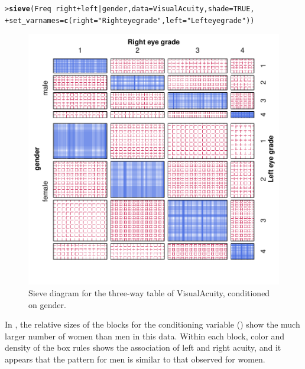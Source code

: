 \documentclass[10pt,krantz2]{krantz}\usepackage[]{graphicx}\usepackage[]{color}
\makeatletter
\newcommand{\hlnum}[1]{\textcolor[rgb]{0.686,0.059,0.569}{#1}}%
\newcommand{\hlstr}[1]{\textcolor[rgb]{0.192,0.494,0.8}{#1}}%
\newcommand{\hlopt}[1]{\textcolor[rgb]{0,0,0}{#1}}%
\newcommand{\hlstd}[1]{\textcolor[rgb]{0.345,0.345,0.345}{#1}}%
\newcommand{\hlkwc}[1]{\textcolor[rgb]{0.333,0.667,0.333}{#1}}%
\newcommand{\hlkwd}[1]{\textcolor[rgb]{0.737,0.353,0.396}{\textbf{#1}}}%
\newenvironment{kframe}{%
 \def\at@end@of@kframe{}%
 \ifinner\ifhmode%
  \def\at@end@of@kframe{\end{minipage}}%
  \begin{minipage}{\columnwidth}%
 \fi\fi%
 \def\FrameCommand##1{\hskip\@totalleftmargin \hskip-\fboxsep
 \colorbox{shadecolor}{##1}\hskip-\fboxsep
     \hskip-\linewidth \hskip-\@totalleftmargin \hskip\columnwidth}%
 \MakeFramed {\advance\hsize-\width
   \@totalleftmargin\z@ \linewidth\hsize
   \@setminipage}}%
 {\par\unskip\endMakeFramed%
 \at@end@of@kframe}
\newenvironment{knitrout}{}{} %
\renewenvironment{knitrout}{\small\renewcommand{\baselinestretch}{.85}}{} %
\makeatother
\begin{document}
\begin{knitrout}
\color{fgcolor}\begin{kframe}
\begin{alltt}
\hlstd{> }\hlkwd{sieve}\hlstd{(Freq} \hlopt{~} \hlstd{right} \hlopt{+} \hlstd{left} \hlopt{|} \hlstd{gender,}  \hlkwc{data} \hlstd{= VisualAcuity,} \hlkwc{shade} \hlstd{=} \hlnum{TRUE}\hlstd{,}
\hlstd{+ }      \hlkwc{set_varnames} \hlstd{=} \hlkwd{c}\hlstd{(}\hlkwc{right} \hlstd{=} \hlstr{"Right eye grade"}\hlstd{,} \hlkwc{left} \hlstd{=} \hlstr{"Left eye grade"}\hlstd{))}
\end{alltt}
\end{kframe}\begin{figure}[!htbp]

\centerline{\includegraphics[width=.7\textwidth]{ch04/fig/VA-sieve3-1} }

\caption[Sieve diagram for the three-way table of VisualAcuity, conditioned on gender]{Sieve diagram for the three-way table of VisualAcuity, conditioned on gender.\label{fig:VA-sieve3}}
\end{figure}


\end{knitrout}

In , the relative sizes of the blocks for the conditioning
variable () show the much larger number of women than men in
this data.  Within each block, color and density of the box rules shows the
association of left and right acuity, and it appears that the pattern
for men is similar to that observed for women.
\end{document}
